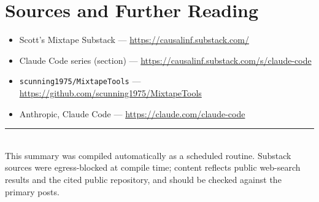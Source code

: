 \documentclass[11pt]{article}
\begin{document}
\section*{Sources and Further Reading}
\begin{itemize}
  \item Scott's Mixtape Substack --- \url{https://causalinf.substack.com/}
  \item Claude Code series (section) ---
        \url{https://causalinf.substack.com/s/claude-code}
  \item \texttt{scunning1975/MixtapeTools} ---
        \url{https://github.com/scunning1975/MixtapeTools}
  \item Anthropic, Claude Code --- \url{https://claude.com/claude-code}
\end{itemize}

\vfill
\noindent\rule{\linewidth}{0.4pt}\\[0.3em]
{\footnotesize This summary was compiled automatically as a scheduled routine.
Substack sources were egress-blocked at compile time; content reflects public
web-search results and the cited public repository, and should be checked
against the primary posts.}
\end{document}
